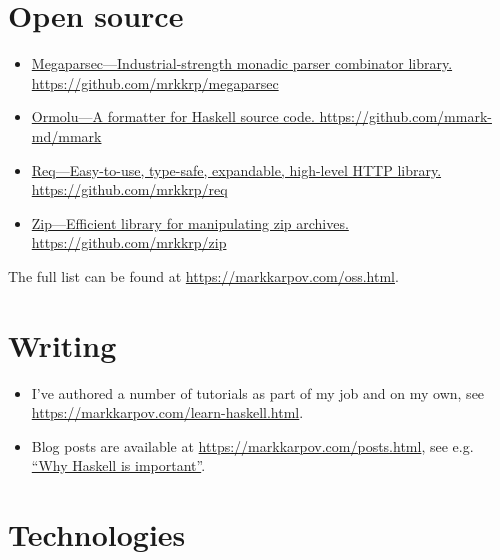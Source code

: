 \documentclass[a4paper,12pt]{article}
\begin{document}
\section*{Open source}

\begin{itemize}[noitemsep]
\item \href{https://github.com/mrkkrp/megaparsec}
  {Megaparsec---Industrial-strength monadic parser combinator library.
    \newline
    https://github.com/mrkkrp/megaparsec}
\item \href{https://github.com/tweag/ormolu}
  {Ormolu---A formatter for Haskell source code.
    \newline
    https://github.com/mmark-md/mmark}
\item \href{https://github.com/mrkkrp/req}
  {Req---Easy-to-use, type-safe, expandable, high-level HTTP library.
    \newline
    https://github.com/mrkkrp/req}
\item \href{https://github.com/mrkkrp/zip}
  {Zip---Efficient library for manipulating zip archives.
    \newline
    https://github.com/mrkkrp/zip}
\end{itemize}

The full list can be found at \href{https://markkarpov.com/oss.html}{https://markkarpov.com/oss.html}.

\pagebreak

\section*{Writing}

\begin{itemize}[noitemsep]
\item I've authored a number of tutorials as part of my job and on my own,
  see \href{https://markkarpov.com/learn-haskell.html}{https://markkarpov.com/learn-haskell.html}.
\item Blog posts are available at
  \href{https://markkarpov.com/posts.html}{https://markkarpov.com/posts.html},
  see e.g.
  \href{https://www.tweag.io/posts/2019-09-06-why-haskell-is-important.html}{“Why
    Haskell is important”}.
\end{itemize}

\section*{Technologies}
\end{document}
